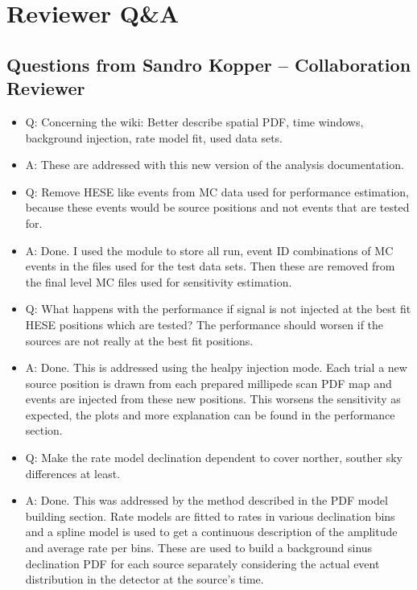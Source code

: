 \section*{Reviewer Q\&A}
\subsection*{Questions from Sandro Kopper -- Collaboration Reviewer}
  \begin{itemize}
      \item Q:
        Concerning the wiki: Better describe spatial PDF, time windows, background injection, rate model fit, used data sets.
      \item A:
        These are addressed with this new version of the analysis documentation.

      \item Q:
        Remove HESE like events from MC data used for performance estimation, because these events would be source positions and not events that are tested for.
      \item A:
        Done.
        I used the  module to store all run, event ID combinations of MC events in the  files used for the test data sets.
        Then these are removed from the final level MC files used for sensitivity estimation.

      \item Q:
        What happens with the performance if signal is not injected at the best fit HESE positions which are tested?
        The performance should worsen if the sources are not really at the best fit positions.
      \item A:
        Done.
        This is addressed using the healpy injection mode.
        Each trial a new source position is drawn from each prepared millipede scan PDF map and events are injected from these new positions.
        This worsens the sensitivity as expected, the plots and more explanation can be found in the performance section.

      \item Q:
        Make the rate model declination dependent to cover norther, souther sky differences at least.
      \item A:
        Done.
        This was addressed by the method described in the PDF model building section.
        Rate models are fitted to rates in various declination bins and a spline model is used to get a continuous description of the amplitude and average rate per bins.
        These are used to build a background sinus declination PDF for each source separately considering the actual event distribution in the detector at the source's time.


\end{itemize}
